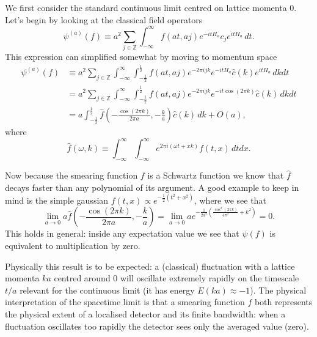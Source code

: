 \documentclass[prl,twocolumn,lengthcheck,superscriptaddress]{revtex4-1}
\theoremstyle{definition}
\theoremstyle{remark}
\begin{document}
We first consider the standard continuous limit centred on lattice momenta $0$. Let's begin by looking at the classical field operators 
\begin{equation}
	\psi^{(a)}(f) \equiv a^2\sum_{j\in\mathbb{Z}} \int_{-\infty}^\infty f(at, aj) e^{-itH_a}c_j e^{itH_a} \, dt.
\end{equation}
This expression can simplified somewhat by moving to momentum space
\begin{equation}
	\begin{split}
		\psi^{(a)}(f) &\equiv a^2\sum_{j\in\mathbb{Z}} \int_{-\infty}^\infty \int_{-\frac12}^{\frac12} f(at, aj) e^{-2\pi i jk} e^{-itH_a}\widehat{c}(k) e^{itH_a} \, dkdt \\
		&= a^2\sum_{j\in\mathbb{Z}} \int_{-\infty}^\infty \int_{-\frac12}^{\frac12} f(at, aj) e^{-2\pi i jk} e^{-it \cos(2\pi k)} \widehat{c}(k)  \, dkdt \\
		&= a\int_{-\frac12}^{\frac12}\widehat{f}\left(-\frac{\cos(2\pi k)}{2\pi a}, -\frac{k}{a}\right) \widehat{c}(k)\, dk + O(a),
	\end{split}
\end{equation}
where
\begin{equation}
	\widehat{f}(\omega,k) \equiv \int_{-\infty}^{\infty} \int_{-\infty}^{\infty} e^{2\pi i (\omega t + xk)}f(t,x)\, dtdx.
\end{equation}

Now because the smearing function $f$ is a Schwartz function we know that $\widehat{f}$ decays faster than any polynomial of its argument. A good example to keep in mind is the simple gaussian $f(t,x) \propto e^{-\frac12(t^2+x^2)}$, where we see that
\begin{equation}
		\lim_{a\rightarrow 0} a\widehat{f}\left(-\frac{\cos(2\pi k)}{2\pi a}, -\frac{k}{a}\right)  = \lim_{a\rightarrow 0} a e^{-\frac{1}{2a^2}( \frac{\cos^2(2\pi k)}{4\pi^2} + k^2)} 
			= 0.
\end{equation}
This holds in general: inside any expectation value we see that $\psi(f)$ is equivalent to multiplication by zero. 

Physically this result is to be expected: a (classical) fluctuation with a lattice momenta $ka$ centred around $0$ will oscillate extremely rapidly on the timescale $t/a$ relevant for the continuous limit (it has energy $E(ka) \approx -1$). The physical interpretation of the spacetime limit is that a smearing function $f$ both represents the physical extent of a localised detector and its finite bandwidth: when a fluctuation oscillates too rapidly the detector sees only the averaged value (zero). 
\end{document}
